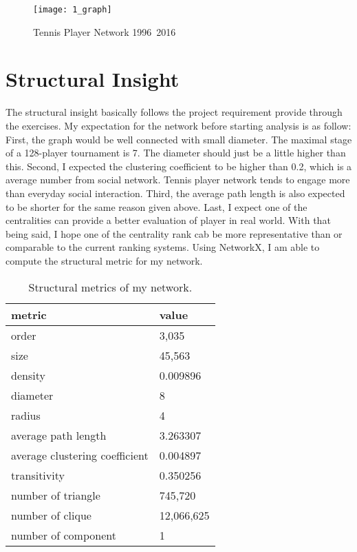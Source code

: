 \documentclass[runningheads]{llncs}
\begin{document}
\begin{figure}[ht]
\texttt{[image: 1\_graph]}
\caption{Tennis Player Network 1996~2016} \label{fig_mynk}
\end{figure}



\section{Structural Insight}

The structural insight basically follows the project requirement provide through the exercises.  My expectation for the network before starting analysis is as follow: 
First, the graph would be well connected with small diameter. The maximal stage of a 128-player tournament is 7. The diameter should just be a little higher than this. Second, I expected the clustering coefficient to be higher than 0.2, which is a average number from social network. Tennis player network tends to engage more than everyday social interaction. Third, the average path length is also expected to be shorter for the same reason given above. Last, I expect one of the centralities can provide a better evaluation of player in real world. With that being said, I hope one of the centrality rank cab be more representative than or comparable to the current ranking systems.
Using NetworkX, I am able to compute the structural metric for my network.
\begin{table}[H]
\centering
\caption{Structural metrics of my network.}\label{tab_my}
\begin{tabular}{|l|l|}
\hline
metric & value \\
\hline
order & 3,035 \\
size & 45,563 \\
density & 0.009896 \\
diameter & 8 \\
radius & 4 \\
average path length & 3.263307 \\
average clustering coefficient & 0.004897 \\
transitivity & 0.350256 \\
number of triangle & 745,720 \\ 
number of clique & 12,066,625 \\
number of component & 1\\
\hline
\end{tabular}
\end{table}
\end{document}
